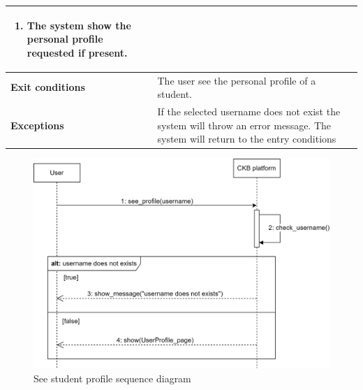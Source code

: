 \begin{enumerate}[label=\textbf{UC.\arabic*}]
\begin{table}[h]
\begin{tabular}{|m{3.2cm}|m{9.8cm}|}
\begin{enumerate}[label=\arabic*.]
                        \item The system show the personal profile requested if present.
                    \end{enumerate}\\ 
                    \hline
                    \textbf{Exit conditions}  & The user see the personal profile of a student. \\
                    \hline
                    \textbf{Exceptions} & If the selected username does not exist the system will throw an error message. The system will return to the entry conditions \\
                    \hline
                \end{tabular}
        \end{table}
        \begin{figure}[h]
            \centering
            \includegraphics[scale = 0.7]{images/sd/seeProfile.png}
            \caption{See student profile sequence diagram}
            \label{fig:sd-seeProfile}
        \end{figure}
    \end{enumerate}    
    \clearpage

